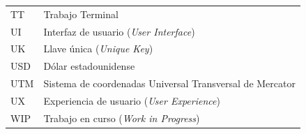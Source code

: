 \begin{longtable}{@{}L{2.4cm}p{\dimexpr\textwidth-2.4cm-2\tabcolsep\relax}@{}}
TT & Trabajo Terminal \\
UI & Interfaz de usuario (\textit{User Interface}) \\
UK & Llave única (\textit{Unique Key}) \\
USD & Dólar estadounidense \\
UTM & Sistema de coordenadas Universal Transversal de Mercator \\
UX & Experiencia de usuario (\textit{User Experience}) \\
WIP & Trabajo en curso (\textit{Work in Progress}) \\
\end{longtable}
